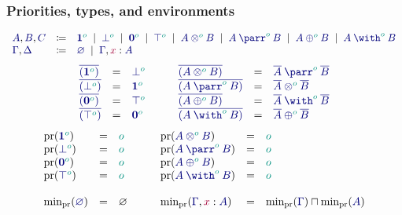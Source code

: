 \documentclass[main.tex]{subfiles}
\begin{document}
\subsubsection{Priorities, types, and environments}
\[
\begin{array}{lcl}
  \ty{A}, \ty{B}, \ty{C}
  & \coloneqq & \ty{\tyone[\cs{o}]}
    \sep        \ty{\tybot[\cs{o}]}
    \sep        \ty{\tynil[\cs{o}]}
    \sep        \ty{\tytop[\cs{o}]}
    \sep        \ty{\tytens[\cs{o}]{A}{B}}
    \sep        \ty{\typarr[\cs{o}]{A}{B}}
    \sep        \ty{\typlus[\cs{o}]{A}{B}}
    \sep        \ty{\tywith[\cs{o}]{A}{B}}
  \\
  \ty{\Gamma}, \ty{\Delta}
  & \coloneqq & \ty{\emptyenv}
    \sep        \ty{\Gamma}, \tmty{x}{A}
\end{array}
\]
\[
\begin{array}{lcl}
  \ty{\co{(\tyone[\cs{o}])}} & = & \ty{\tybot[\cs{o}]} \\
  \ty{\co{(\tybot[\cs{o}])}} & = & \ty{\tyone[\cs{o}]} \\
  \ty{\co{(\tynil[\cs{o}])}} & = & \ty{\tytop[\cs{o}]} \\
  \ty{\co{(\tytop[\cs{o}])}} & = & \ty{\tynil[\cs{o}]}
\end{array}
\qquad
\begin{array}{lcl}
  \ty{\co{(\tytens[\cs{o}]{A}{B})}} & = & \ty{\typarr[\cs{o}]{\co{A}}{\co{B}}} \\
  \ty{\co{(\typarr[\cs{o}]{A}{B})}} & = & \ty{\tytens[\cs{o}]{\co{A}}{\co{B}}} \\
  \ty{\co{(\typlus[\cs{o}]{A}{B})}} & = & \ty{\tywith[\cs{o}]{\co{A}}{\co{B}}} \\
  \ty{\co{(\tywith[\cs{o}]{A}{B})}} & = & \ty{\typlus[\cs{o}]{\co{A}}{\co{B}}}
\end{array}
\]
\[
\begin{array}{lclclcl}
  \pr(\ty{\tyone[\cs{o}]})        & = & \cs{o}  \\
  \pr(\ty{\tybot[\cs{o}]})        & = & \cs{o}  \\
  \pr(\ty{\tynil[\cs{o}]})        & = & \cs{o}  \\
  \pr(\ty{\tytop[\cs{o}]})        & = & \cs{o}  \\
  \\
  \minpr(\ty{\emptyenv})          & = & \varnothing
\end{array}
\qquad
\begin{array}{lclclcl}
  \pr(\ty{\tytens[\cs{o}]{A}{B}}) & = & \cs{o}  \\
  \pr(\ty{\typarr[\cs{o}]{A}{B}}) & = & \cs{o}  \\
  \pr(\ty{\typlus[\cs{o}]{A}{B}}) & = & \cs{o}  \\
  \pr(\ty{\tywith[\cs{o}]{A}{B}}) & = & \cs{o}  \\
  \\
  \minpr(\ty{\Gamma},\tmty{x}{A}) & = & \minpr(\ty{\Gamma})\sqcap\minpr(\ty{A})
\end{array}
\]
\end{document}

